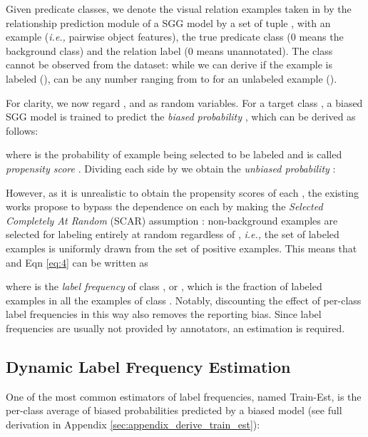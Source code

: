 \documentclass[sigconf]{acmart}
\begin{document}
Given  predicate classes, we denote the visual relation examples taken in by the relationship prediction module of a SGG model by a set of tuple , with  an example (\emph{i.e.,} pairwise object features),  the true predicate class (0 means the background class) and  the relation label (0 means unannotated).
The class  cannot be observed from the dataset: while we can derive  if the example is labeled (),  can be any number ranging from  to  for an unlabeled example ().

For clarity, we now regard ,  and  as random variables.
For a target class , a biased SGG model is trained to predict the \textit{biased probability} , which can be derived as follows:

where  is the probability of example  being selected to be labeled and is called \textit{propensity score} \cite{bekker2020learning}.
Dividing each side by  we obtain the \textit{unbiased probability} :

However, as it is unrealistic to obtain the propensity scores of each , the existing works propose to \cite{elkan2008learning,chen2019soft} bypass the dependence on each  by making the \textit{Selected Completely At Random} (SCAR) assumption \cite{bekker2020learning}: non-background examples are selected for labeling entirely at random regardless of , \emph{i.e.,} the set of labeled examples is uniformly drawn from the set of positive examples.
This means that  and Eqn \ref{eq:4} can be written as

where  is the \textit{label frequency} of class , or , which is the fraction of labeled examples in all the examples of class .
Notably, discounting the effect of per-class label frequencies in this way also removes the reporting bias.
Since label frequencies are usually not provided by annotators, an estimation is required.

\subsection{Dynamic Label Frequency Estimation}
\label{sec:dlfe}

One of the most common estimators of label frequencies, named Train-Est, is the per-class average of biased probabilities  predicted by a biased model \cite{elkan2008learning} (see full derivation in Appendix \ref{sec:appendix_derive_train_est}):
\end{document}
